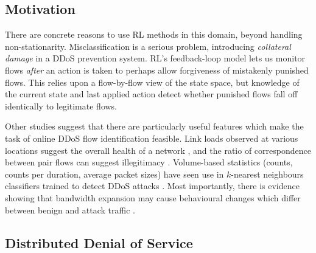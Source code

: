 \documentclass[10pt, times, conference, letterpaper]{IEEEtran}
\begin{document}
\subsection{Motivation}\label{sec:motivation}
There are concrete reasons to use RL methods in this domain, beyond handling non-stationarity.
Misclassification is a serious problem, introducing \emph{collateral damage} in a DDoS prevention system.
RL's feedback-loop model lets us monitor flows \emph{after} an action is taken to perhaps allow forgiveness of mistakenly punished flows.
This relies upon a flow-by-flow view of the state space, but knowledge of the current state and last applied action detect whether punished flows fall off identically to legitimate flows.

Other studies suggest that there are particularly useful features which make the task of online DDoS flow identification feasible.
Link loads observed at various locations suggest the overall health of a network \cite{DBLP:journals/eaai/MalialisK15}, and the ratio of correspondence between pair flows can suggest illegitimacy \cite{DBLP:conf/ndss/Rossow14}.
Volume-based statistics (counts, counts per duration, average packet sizes) have seen use in $k$-nearest neighbours classifiers trained to detect DDoS attacks \cite{DBLP:conf/dsn/LeeKSPY17}.
Most importantly, there is evidence showing that bandwidth expansion may cause behavioural changes which differ between benign and attack traffic \cite{DBLP:conf/ndss/KangGS16}.

\subsection{Distributed Denial of Service}
\end{document}

